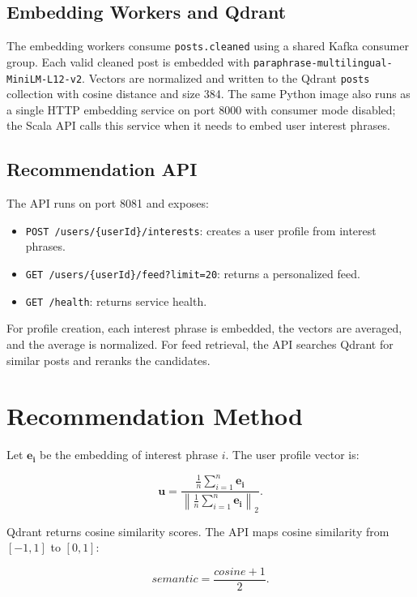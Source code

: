 \documentclass[conference]{IEEEtran}
\begin{document}
\subsection{Embedding Workers and Qdrant}
The embedding workers consume \texttt{posts.cleaned} using a shared Kafka consumer group. Each valid cleaned post is embedded with \texttt{paraphrase-multilingual-MiniLM-L12-v2}. Vectors are normalized and written to the Qdrant \texttt{posts} collection with cosine distance and size 384. The same Python image also runs as a single HTTP embedding service on port 8000 with consumer mode disabled; the Scala API calls this service when it needs to embed user interest phrases.

\subsection{Recommendation API}
The API runs on port 8081 and exposes:

\begin{itemize}
\item \texttt{POST /users/\{userId\}/interests}: creates a user profile from interest phrases.
\item \texttt{GET /users/\{userId\}/feed?limit=20}: returns a personalized feed.
\item \texttt{GET /health}: returns service health.
\end{itemize}

For profile creation, each interest phrase is embedded, the vectors are averaged, and the average is normalized. For feed retrieval, the API searches Qdrant for similar posts and reranks the candidates.

\section{Recommendation Method}
Let \(\mathbf{e_i}\) be the embedding of interest phrase \(i\). The user profile vector is:

\begin{equation}
\mathbf{u} =
\frac{\frac{1}{n}\sum_{i=1}^{n}\mathbf{e_i}}
{\left\|\frac{1}{n}\sum_{i=1}^{n}\mathbf{e_i}\right\|_2}.
\end{equation}

Qdrant returns cosine similarity scores. The API maps cosine similarity from \([-1,1]\) to \([0,1]\):

\begin{equation}
semantic = \frac{cosine + 1}{2}.
\end{equation}
\end{document}
